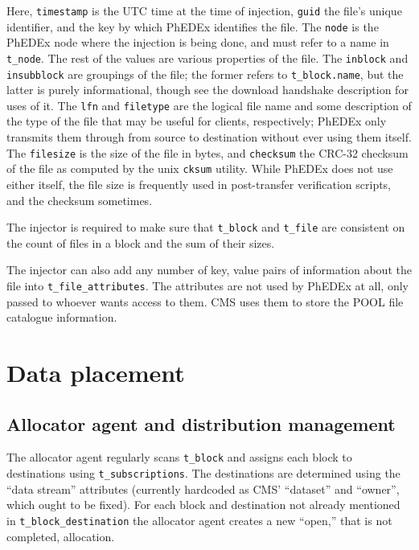 \documentclass{cmspaper}
\begin{document}
Here, \texttt{timestamp} is the UTC time at the time of injection, \texttt{guid} the file's unique identifier, and the key by which PhEDEx identifies the file.  The \texttt{node} is the PhEDEx node where the injection is being done, and must refer to a name in \texttt{t\_node}.  The rest of the values are various properties of the file.  The \texttt{inblock} and \texttt{insubblock} are groupings of the file; the former refers to \texttt{t\_block.name}, but the latter is purely informational, though see the download handshake description for uses of it.  The \texttt{lfn} and \texttt{filetype} are the logical file name and some description of the type of the file that may be useful for clients, respectively; PhEDEx only transmits them through from source to destination without ever using them itself.  The \texttt{filesize} is the size of the file in bytes, and \texttt{checksum} the CRC-32 checksum of the file as computed by the unix \texttt{cksum} utility.  While PhEDEx does not use either itself, the file size is frequently used in post-transfer verification scripts, and the checksum sometimes.

The injector is required to make sure that \texttt{t\_block} and \texttt{t\_file} are consistent on the count of files in a block and the sum of their sizes.

The injector can also add any number of key, value pairs of information about the file into \texttt{t\_file\_attributes}.  The attributes are not used by PhEDEx at all, only passed to whoever wants access to them.  CMS uses them to store the POOL file catalogue information.


\section{Data placement}

\subsection{Allocator agent and distribution management}

The allocator agent regularly scans \texttt{t\_block} and assigns each block to destinations using \texttt{t\_subscriptions}.  The destinations are determined using the ``data stream'' attributes (currently hardcoded as CMS' ``dataset'' and ``owner'', which ought to be fixed).  For each block and destination not already mentioned in \texttt{t\_block\_destination} the allocator agent creates a new ``open,'' that is not completed, allocation.
\end{document}
